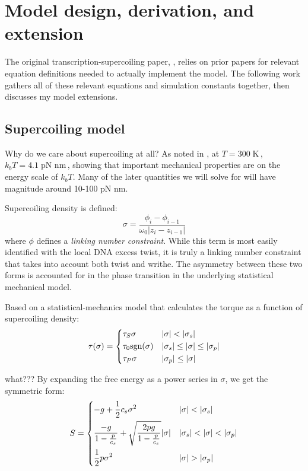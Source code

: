 \documentclass[11pt]{article}
\newcommand{\unit}[1]{\; \text{#1}\,}
\begin{document}
\printbibliography

\clearpage
\appendix
\renewcommand{\appendixpagename}{Supplemental information}
\appendixpage
\section{Model design, derivation, and extension}
\label{sec:appendix:model}
The original transcription-supercoiling paper, \cite{sevierPropertiesGeneExpression2018}, relies on prior papers for relevant equation definitions needed to actually implement the model. The following work gathers all of these relevant equations and simulation constants together, then discusses my model extensions.

\subsection{Supercoiling model}
Why do we care about supercoiling at all? As noted in \textcite{markoTorqueDynamicsLinking2007}, at \(T = 300 \unit{K}\), \(k_b T = 4.1 \unit{pN nm}\), showing that
important mechanical properties are on the energy scale of \(k_b T\). Many of the later quantities we will solve for will have magnitude around 10-100 pN nm.

Supercoiling density is defined:
\begin{equation}
    \sigma = \frac{\phi_i - \phi_{i - 1}}{\omega_0 | z_{i} - z_{i-1}|}
    \label{eq:sc_density}
\end{equation}
where \(\phi\) defines a \emph{linking number constraint}. While this term is most easily identified with the local DNA excess twist, it is truly a linking number constraint that takes into account both twist and writhe. The asymmetry between these two forms is accounted for in the phase transition in the underlying statistical mechanical model.

Based on a statistical-mechanics model that calculates the torque as a function of supercoiling density:
\begin{equation}
    \tau(\sigma) = \begin{dcases} \tau_S \sigma & |\sigma| < |\sigma_s| \\ \tau_0 \text{sgn}(\sigma) & |\sigma_s| \leq |\sigma | \leq |\sigma_p| \\ \tau_P \sigma & |\sigma_p| \leq |\sigma|\end{dcases}
\end{equation}

what???
By expanding the free energy as a power series in \(\sigma\), we get the symmetric form:
\begin{equation}
    S = \begin{dcases}
        -g + \frac{1}{2} c_s \sigma^2 & |\sigma| < |\sigma_s| \\
        \frac{-g}{1 - \frac{p}{c_s}} + \sqrt{\frac{2 p g}{1 - \frac{p}{c_s}}} |\sigma| & |\sigma_s| < |\sigma| < |\sigma_p| \\
        \frac{1}{2} p \sigma^2 & |\sigma| > |\sigma_p|
    \end{dcases}
\end{equation}
\end{document}
